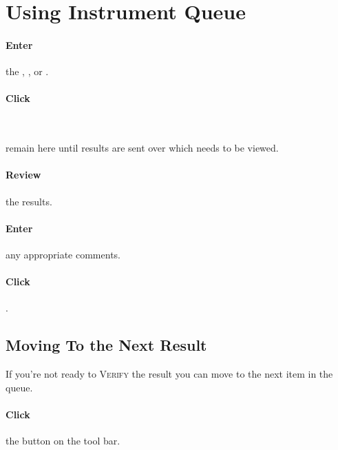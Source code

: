 \section{Using Instrument Queue}

\paragraph{Enter} the \instrument, \bench, \sect or \subsect.

\paragraph{Click} \\


 remain here until results are sent over which needs to be viewed.


\paragraph{Review} the results.

\paragraph{Enter} any appropriate comments.

\paragraph{Click} .

\subsection{Moving To the Next Result}

If you're not ready to \textsc{Verify} the result you can move to the next item in the queue.

\paragraph{Click} the  button on the tool bar.


